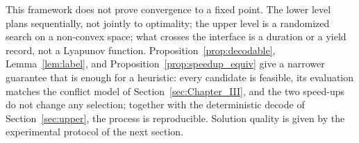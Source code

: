 This framework does not prove convergence to a fixed point.
The lower level plans sequentially, not jointly to optimality; the upper level is a randomized search on a non-convex space; what crosses the interface is a duration or a yield record, not a Lyapunov function.
Proposition~\ref{prop:decodable}, Lemma~\ref{lem:label}, and Proposition~\ref{prop:speedup_equiv} give a narrower guarantee that is enough for a heuristic: every candidate is feasible, its evaluation matches the conflict model of Section~\ref{sec:Chapter_III}, and the two speed-ups do not change any selection; together with the deterministic decode of Section~\ref{sec:upper}, the process is reproducible.
Solution quality is given by the experimental protocol of the next section.

